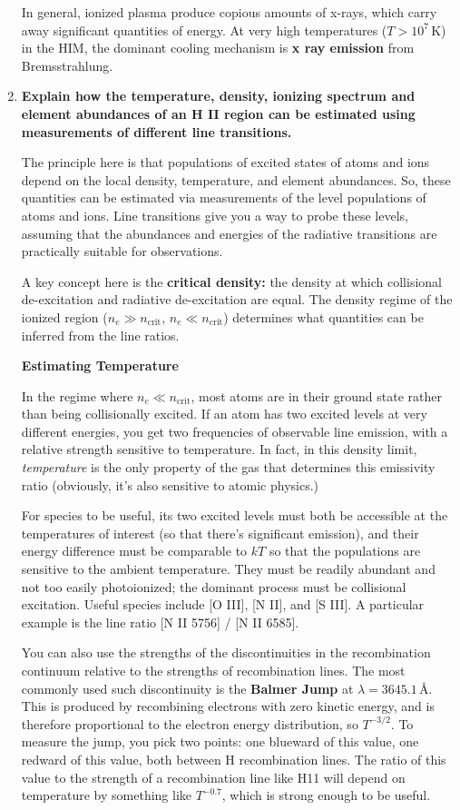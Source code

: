 \documentclass[12pt, letterpaper, preprint]{aastex}
\newcommand{\ncrit}{\mbox{$n_\mathrm{crit}$}}
\begin{document}
\begin{enumerate}
In general, ionized plasma produce copious amounts of x-rays, which carry away significant quantities of energy. At very high temperatures ($T > 10^7$\,K) in the HIM, the dominant cooling mechanism is \textbf{x ray emission} from Bremsstrahlung. 

\newpage

\item \textbf{Explain how the temperature, density, ionizing spectrum and element abundances of an H II region can be estimated using measurements of different line transitions.}

The principle here is that populations of excited states of atoms and ions depend on the local density, temperature, and element abundances. So, these quantities can be estimated via measurements of the level populations of atoms and ions. Line transitions give you a way to probe these levels, assuming that the abundances and energies of the radiative transitions are practically suitable for observations. 

A key concept here is the \textbf{critical density:} the density at which collisional de-excitation and radiative de-excitation are equal. The density regime of the ionized region ($n_e \gg \ncrit$, $n_e \ll \ncrit$) determines what quantities can be inferred from the line ratios.

\textbf{Estimating Temperature}

In the regime where $n_e \ll \ncrit$, most atoms are in their ground state rather than being collisionally excited. If an atom has two excited levels at very different energies, you get two frequencies of observable line emission, with a relative strength sensitive to temperature.
In fact, in this density limit, \emph{temperature} is the only property of the gas that determines this emissivity ratio (obviously, it's also sensitive to atomic physics.) 

For species to be useful, its two excited levels must both be accessible at the temperatures of interest (so that there's significant emission),
and their energy difference must be comparable to $kT$ so that the populations are sensitive to the ambient temperature.
They must be readily abundant and not too easily photoionized;
the dominant process must be collisional excitation.
Useful species include [O III], [N II], and [S III]. 
A particular example is the line ratio [N II 5756] / [N II 6585]. 

You can also use the strengths of the discontinuities in the recombination continuum relative to the strengths of recombination lines.
The most commonly used such discontinuity is the \textbf{Balmer Jump}
at $\lambda = 3645.1$\,\AA. This is produced by recombining electrons with zero kinetic energy, and is therefore proportional to the electron energy distribution, so $T^{-3/2}$. To measure the jump, you pick two points: one blueward of this value, one redward of this value, both between H recombination lines. The ratio of this value to the strength of a recombination line like H11 will depend on temperature by something like $T^{-0.7}$, which is strong enough to be useful. 


\end{enumerate}
\end{document}
